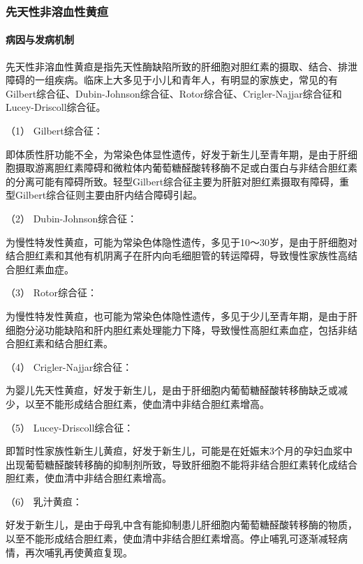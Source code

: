\subsubsection{先天性非溶血性黄疸}

\paragraph{病因与发病机制}

先天性非溶血性黄疸是指先天性酶缺陷所致的肝细胞对胆红素的摄取、结合、排泄障碍的一组疾病。临床上大多见于小儿和青年人，有明显的家族史，常见的有Gilbert综合征、Dubin-Johnson综合征、Rotor综合征、Crigler-Najjar综合征和Lucey-Driscoll综合征。

\hypertarget{text00039.htmlux5cux23CHP1-16-4-2-1-1}{}
（1） Gilbert综合征：

即体质性肝功能不全，为常染色体显性遗传，好发于新生儿至青年期，是由于肝细胞摄取游离胆红素障碍和微粒体内葡萄糖醛酸转移酶不足或白蛋白与非结合胆红素的分离可能有障碍所致。轻型Gilbert综合征主要为肝脏对胆红素摄取有障碍，重型Gilbert综合征则主要由肝内结合障碍引起。

\hypertarget{text00039.htmlux5cux23CHP1-16-4-2-1-2}{}
（2） Dubin-Johnson综合征：

为慢性特发性黄疸，可能为常染色体隐性遗传，多见于10～30岁，是由于肝细胞对结合胆红素和其他有机阴离子在肝内向毛细胆管的转运障碍，导致慢性家族性高结合胆红素血症。

\hypertarget{text00039.htmlux5cux23CHP1-16-4-2-1-3}{}
（3） Rotor综合征：

为慢性特发性黄疸，也可能为常染色体隐性遗传，多见于少儿至青年期，是由于肝细胞分泌功能缺陷和肝内胆红素处理能力下降，导致慢性高胆红素血症，包括非结合胆红素和结合胆红素。

\hypertarget{text00039.htmlux5cux23CHP1-16-4-2-1-4}{}
（4） Crigler-Najjar综合征：

为婴儿先天性黄疸，好发于新生儿，是由于肝细胞内葡萄糖醛酸转移酶缺乏或减少，以至不能形成结合胆红素，使血清中非结合胆红素增高。

\hypertarget{text00039.htmlux5cux23CHP1-16-4-2-1-5}{}
（5） Lucey-Driscoll综合征：

即暂时性家族性新生儿黄疸，好发于新生儿，可能是在妊娠末3个月的孕妇血浆中出现葡萄糖醛酸转移酶的抑制剂所致，导致肝细胞不能将非结合胆红素转化成结合胆红素，使血清中非结合胆红素增高。

\hypertarget{text00039.htmlux5cux23CHP1-16-4-2-1-6}{}
（6） 乳汁黄疸：

好发于新生儿，是由于母乳中含有能抑制患儿肝细胞内葡萄糖醛酸转移酶的物质，以至不能形成结合胆红素，使血清中非结合胆红素增高。停止哺乳可逐渐减轻病情，再次哺乳再使黄疸复现。


